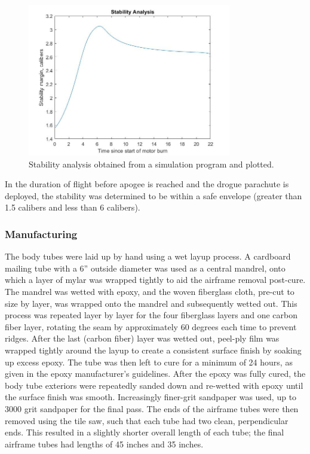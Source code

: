 \begin{figure}[H]
	\centering
	\includegraphics[width=3.5in]{imgs/stabilityanalysis.jpg}
	\caption{Stability analysis obtained from a simulation program  and plotted.}
	\label{fig:stability}
\end{figure}
In the duration of flight before apogee is reached and the drogue parachute is deployed, the stability was determined to be within a safe envelope (greater than 1.5 calibers and less than 6 calibers).
\subsubsection*{Manufacturing}
The body tubes were laid up by hand using a wet layup process. A cardboard mailing tube with a 6'' outside diameter was used as a central mandrel, onto which a layer of mylar was wrapped tightly to aid the airframe removal post-cure. The mandrel was wetted with epoxy, and the woven fiberglass cloth, pre-cut to size by layer, was wrapped onto the mandrel and subsequently wetted out. This process was repeated layer by layer for the four fiberglass layers and one carbon fiber layer, rotating the seam by approximately 60 degrees each time to prevent ridges. After the last (carbon fiber) layer was wetted out, peel-ply film was wrapped tightly around the layup to create a consistent surface finish by soaking up excess epoxy. The tube was then left to cure for a minimum of 24 hours, as given in the epoxy manufacturer’s guidelines.
\newline\newline
After the epoxy was fully cured, the body tube exteriors were repeatedly sanded down and re-wetted with epoxy until the surface finish was smooth. Increasingly finer-grit sandpaper was used, up to 3000 grit sandpaper for the final pass. The ends of the airframe tubes were then removed using the tile saw, such that each tube had two clean, perpendicular ends. This resulted in a slightly shorter overall length of each tube; the final airframe tubes had lengths of 45 inches and 35 inches. 
